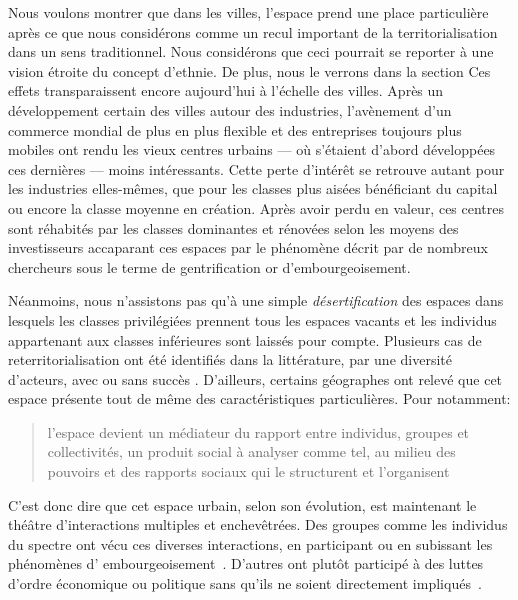 Nous voulons montrer que dans les villes, l'espace prend une place particulière après ce que nous considérons comme un recul important de la territorialisation dans un sens traditionnel. 
Nous considérons que ceci pourrait se reporter à une vision étroite du concept d'ethnie. 
De plus, nous le verrons dans la section  
Ces effets transparaissent encore aujourd'hui à l'échelle des villes. 
Après un développement certain des villes autour des industries, l'avènement d'un commerce mondial de plus en plus flexible et des entreprises toujours plus mobiles ont rendu les vieux centres urbains --- où s'étaient d'abord développées ces dernières --- moins intéressants.
Cette perte d'intérêt se retrouve autant pour les industries elles-mêmes, que pour les classes plus aisées bénéficiant du capital ou encore la classe moyenne en création. 
Après avoir perdu en valeur, ces centres sont réhabités par les classes dominantes et rénovées selon les moyens des investisseurs accaparant ces espaces par le phénomène décrit par de nombreux chercheurs sous le terme de gentrification or d'embourgeoisement.

Néanmoins, nous n'assistons pas qu'à une simple \emph{désertification} des espaces dans lesquels les classes privilégiées prennent tous les espaces vacants et les individus appartenant aux classes inférieures sont laissés pour compte.
Plusieurs cas de reterritorialisation ont été identifiés dans la littérature, par une diversité d'acteurs, avec ou sans succès \citet{Hatvany2005}. 
D'ailleurs, certains géographes ont relevé que cet espace présente tout de même des caractéristiques particulières. 
Pour \citeauthor{Courville1991} notamment: \blockquote[{\cite[41]{Courville1991}}][.]{l'espace devient un médiateur du rapport entre individus, groupes et collectivités, un produit social à analyser comme tel, au milieu des pouvoirs et des rapports sociaux qui le structurent et l'organisent}.

C'est donc dire que cet espace urbain, selon son évolution, est maintenant le théâtre d'interactions multiples et enchevêtrées. 
Des groupes comme les individus du spectre \lgbt{} ont vécu ces diverses interactions, en participant ou en subissant les phénomènes d’ embourgeoisement~\autocite{Podmore2001,Giraud2014,Hogan2005}. 
D'autres ont plutôt participé à des luttes d'ordre économique ou politique sans qu'ils ne soient directement impliqués~\autocite{Kelliher2014}. 

